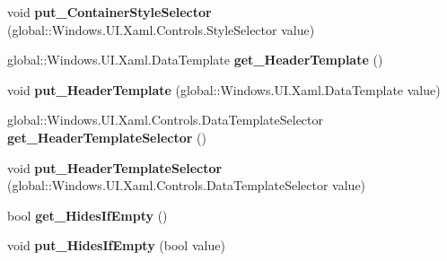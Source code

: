 \begin{DoxyCompactItemize}
\item 
\mbox{\label{interface_windows_1_1_u_i_1_1_xaml_1_1_controls_1_1_i_group_style_a02ae70e78fa1f73a90c99f25ffb93918}} 
void {\bfseries put\+\_\+\+Container\+Style\+Selector} (global\+::\+Windows.\+U\+I.\+Xaml.\+Controls.\+Style\+Selector value)
\item 
\mbox{\label{interface_windows_1_1_u_i_1_1_xaml_1_1_controls_1_1_i_group_style_ae2c73494e7acf4a2194f66515b44cb36}} 
global\+::\+Windows.\+U\+I.\+Xaml.\+Data\+Template {\bfseries get\+\_\+\+Header\+Template} ()
\item 
\mbox{\label{interface_windows_1_1_u_i_1_1_xaml_1_1_controls_1_1_i_group_style_a740a71b8b3a99bb878e9ba66ebae7c4d}} 
void {\bfseries put\+\_\+\+Header\+Template} (global\+::\+Windows.\+U\+I.\+Xaml.\+Data\+Template value)
\item 
\mbox{\label{interface_windows_1_1_u_i_1_1_xaml_1_1_controls_1_1_i_group_style_a28c8a1b47d3dbd9c19e2499b6b78dd6b}} 
global\+::\+Windows.\+U\+I.\+Xaml.\+Controls.\+Data\+Template\+Selector {\bfseries get\+\_\+\+Header\+Template\+Selector} ()
\item 
\mbox{\label{interface_windows_1_1_u_i_1_1_xaml_1_1_controls_1_1_i_group_style_a7afe7db38684a1546bd50fa72f58ec53}} 
void {\bfseries put\+\_\+\+Header\+Template\+Selector} (global\+::\+Windows.\+U\+I.\+Xaml.\+Controls.\+Data\+Template\+Selector value)
\item 
\mbox{\label{interface_windows_1_1_u_i_1_1_xaml_1_1_controls_1_1_i_group_style_a9bc855cd77a4f2a8ba5d4c3e7c7174a9}} 
bool {\bfseries get\+\_\+\+Hides\+If\+Empty} ()
\item 
\mbox{\label{interface_windows_1_1_u_i_1_1_xaml_1_1_controls_1_1_i_group_style_aa1cde0010b3374a26237b4f39bcf3370}} 
void {\bfseries put\+\_\+\+Hides\+If\+Empty} (bool value)

\end{DoxyCompactItemize}
